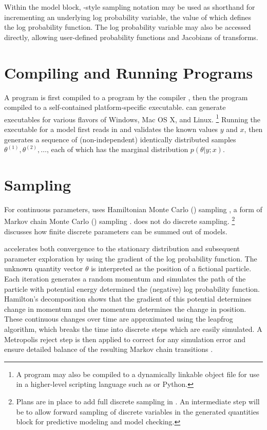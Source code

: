 Within the model block, \BUGS-style sampling notation may be used as
shorthand for incrementing an underlying log probability variable, the
value of which defines the log probability function.  The log
probability variable may also be accessed directly, allowing
user-defined probability functions and Jacobians of transforms.


\section{Compiling and Running \Stan Programs}

A \Stan program is first compiled to a \Cpp program by the \Stan
compiler \stanc, then the \Cpp program compiled to a self-contained
platform-specific executable.  \Stan can generate executables for
various flavors of Windows, Mac OS X, and Linux.%
%
\footnote{A \Stan program may also be compiled to a dynamically
  linkable object file for use in a higher-level scripting language
  such as \R or Python.}
%
Running the \Stan executable for a model first reads in and validates
the known values $y$ and $x$, then generates a sequence of
(non-independent) identically distributed samples $\theta^{(1)},
\theta^{(2)}, \ldots$, each of which has the marginal distribution
$p(\theta|y;x)$.


\section{Sampling}

For continuous parameters, \Stan uses Hamiltonian Monte Carlo (\HMC)
sampling \citep{Duane:1987, Neal:1994, Neal:2011}, a form of Markov chain Monte
Carlo (\MCMC) sampling \citep{Metropolis:1953}.   does not do
discrete sampling.%
%
\footnote{Plans are in place to add full discrete sampling in .  An intermediate step will be to allow forward sampling of
  discrete variables in the generated quantities block for predictive
  modeling and model checking.}
%
 discusses how finite discrete parameters
can be summed out of models.

\HMC accelerates both convergence to the stationary distribution and
subsequent parameter exploration by using the gradient of the log
probability function.  The unknown quantity vector $\theta$ is
interpreted as the position of a fictional particle.  Each iteration
generates a random momentum and simulates the path of the particle
with potential energy determined the (negative) log probability
function.  Hamilton's decomposition shows that the gradient of this
potential determines change in momentum and the momentum determines
the change in position.  These continuous changes over time are
approximated using the leapfrog algorithm, which breaks the time into
discrete steps which are easily simulated.  A Metropolis reject step
is then applied to correct for any simulation error and ensure
detailed balance of the resulting Markov chain transitions
\citep{Metropolis:1953, Hastings:1970}.

